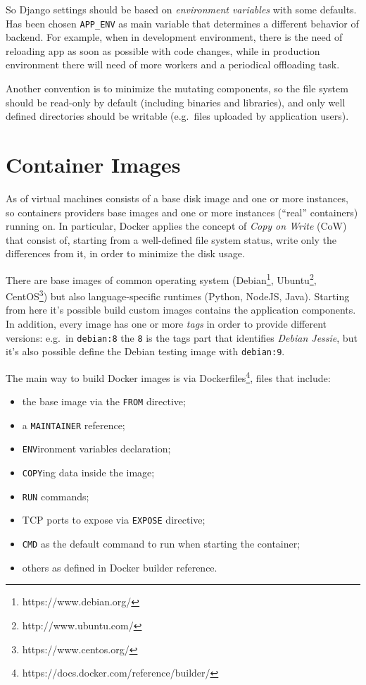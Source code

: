 So Django settings should be based on \textit{environment variables} with
some defaults. Has been chosen \texttt{APP\_ENV} as main variable that
determines a different behavior of backend. For example, when in
development environment, there is the need of reloading app as soon as
possible with code changes, while in production environment there will
need of more workers and a periodical offloading task.

Another convention is to minimize the mutating components, so the file
system should be read-only by default (including binaries and
libraries), and only well defined directories should be writable
(e.g.~files uploaded by application users).

\section{Container Images}\label{container-images}

As of virtual machines consists of a base disk image and one or more
instances, so containers providers base images and one or more instances
(``real'' containers) running on. In particular, Docker applies the
concept of \textit{Copy on Write} (CoW) that consist of, starting from a
well-defined file system status, write only the differences from it, in
order to minimize the disk usage.

There are base images of common operating system (Debian\footnote{https://www.debian.org/}, Ubuntu\footnote{http://www.ubuntu.com/},
CentOS\footnote{https://www.centos.org/}) but also language-specific runtimes (Python, NodeJS, Java).
Starting from here it's possible build custom images contains the
application components. In addition, every image has one or more
\textit{tags} in order to provide different versions: e.g.~in
\texttt{debian:8} the \texttt{8} is the tags part that identifies
\textit{Debian Jessie}, but it's also possible define the Debian testing
image with \texttt{debian:9}.

The main way to build Docker images is via Dockerfiles\footnote{https://docs.docker.com/reference/builder/}, files that include:
\begin{itemize}

\item
  the base image via the \texttt{FROM} directive;
\item
  a \texttt{MAINTAINER} reference;
\item
  \texttt{ENV}ironment variables declaration;
\item
  \texttt{COPY}ing data inside the image;
\item
  \texttt{RUN} commands;
\item
  TCP ports to expose via \texttt{EXPOSE} directive;
\item
  \texttt{CMD} as the default command to run when starting the container;
\item
  others as defined in Docker builder reference.
\end{itemize}


